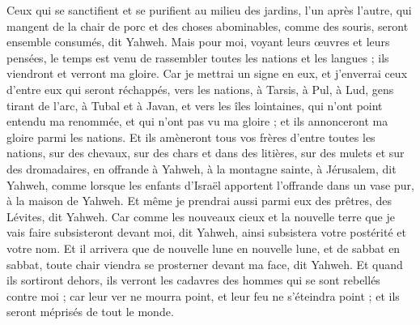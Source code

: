 \begin{multicols}{2}
Ceux qui se sanctifient et se purifient au milieu des jardins, l'un après l'autre, qui mangent de la chair de porc et des choses abominables, comme des souris, seront ensemble consumés, dit Yahweh.
Mais pour moi, voyant leurs œuvres et leurs pensées, le temps est venu de rassembler toutes les nations et les langues ; ils viendront et verront ma gloire.
Car je mettrai un signe en eux, et j'enverrai ceux d'entre eux qui seront réchappés, vers les nations, à Tarsis, à Pul, à Lud, gens tirant de l'arc, à Tubal et à Javan, et vers les îles lointaines, qui n'ont point entendu ma renommée, et qui n'ont pas vu ma gloire ; et ils annonceront ma gloire parmi les nations.
Et ils amèneront tous vos frères d'entre toutes les nations, sur des chevaux, sur des chars et dans des litières, sur des mulets et sur des dromadaires, en offrande à Yahweh, à la montagne sainte, à Jérusalem, dit Yahweh, comme lorsque les enfants d'Israël apportent l'offrande dans un vase pur, à la maison de Yahweh.
Et même je prendrai aussi parmi eux des prêtres, des Lévites, dit Yahweh.
Car comme les nouveaux cieux et la nouvelle terre que je vais faire subsisteront devant moi, dit Yahweh, ainsi subsistera votre postérité et votre nom.
Et il arrivera que de nouvelle lune en nouvelle lune, et de sabbat en sabbat, toute chair viendra se prosterner devant ma face, dit Yahweh.
Et quand ils sortiront dehors, ils verront les cadavres des hommes qui se sont rebellés contre moi ; car leur ver ne mourra point, et leur feu ne s'éteindra point ; et ils seront méprisés de tout le monde.
\PPE{}
\end{multicols}
